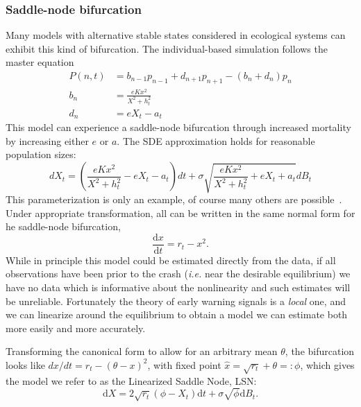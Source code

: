 \documentclass{pnastwo}
\newcommand{\ud}{\mathrm{d}}
\begin{document}
\begin{article}
\subsubsection{Saddle-node bifurcation}
Many models with alternative stable states considered in ecological systems can exhibit this kind of bifurcation.
The individual-based simulation follows the master equation  
\begin{align}
  P(n,t) &= b_{n-1} p_{n-1} + d_{n+1}p_{n+1} - (b_n+d_n)p_n  \label{master} \\ 
  b_n &= \frac{e K x^2}{X^2 + h_t^2} \nonumber \\ 
  d_n &= e X_t - a_t   \nonumber
\end{align}
This model can experience a saddle-node bifurcation through increased mortality by increasing either $e$ or $a$. 
The SDE approximation holds for reasonable population sizes:
\begin{equation}
dX_t = \left( \frac{e K x^2}{X^2 + h_t^2} - e X_t - a_t\right) dt + \sigma \sqrt{ \frac{e K x^2}{X^2 + h_t^2} + e X_t + a_t} dB_t \label{ass}
\end{equation}
This parameterization is only an example, of course many others are possible~\cite{Scheffer2009, Scheffer2001, Strogatz2001a, Guckenheimer1983}. 
Under appropriate transformation, all can be written in the same normal form for he saddle-node bifurcation,
\begin{equation}
\frac{\ud x}{\ud t} = r_t- x^2.
\label{saddle-node}
\end{equation}
While in principle this model could be estimated directly from the data,
if all observations have been prior to the crash (\emph{i.e.} near the desirable equilibrium)
we have no data which is informative about the nonlinearity and such estimates will be unreliable.  
Fortunately the theory of early warning signals is a \emph{local} one, 
and we can linearize around the equilibrium to obtain a model we can estimate both more easily and more accurately.  

Transforming the canonical form to allow for an arbitrary mean $\theta$,
the bifurcation looks like $ dx/dt = r_t- (\theta-x)^2 $, with fixed point $\hat x = \sqrt{r_t} +\theta =: \phi$,
which gives the model we refer to as the Linearized Saddle Node, LSN: 
\begin{equation}
\ud X = 2\sqrt{ r_t } (\phi - X_t)\ud t + \sigma\sqrt{\phi } \ud B_t. \label{LSN}
\end{equation}


\end{article}
\end{document}
